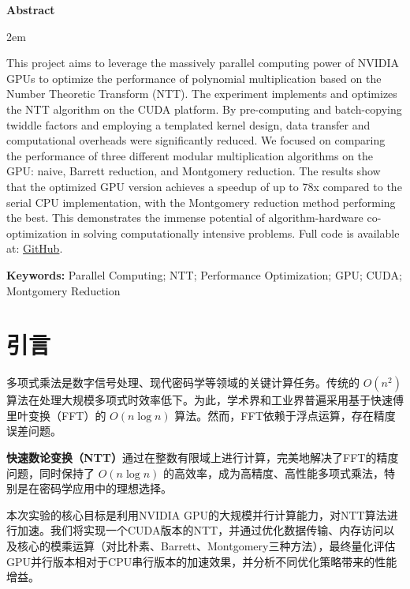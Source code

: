 \documentclass[a4paper]{article}
\newenvironment{enabstract}{
    \par\small
    \noindent\mbox{}\par\vspace{-\baselineskip}
    \par\parindent 2em
    }
    {\par\vspace{1em}}
\begin{document}
\begin{center}{\bfseries{Abstract}}\end{center}\par\vspace{0.5em}
\begin{enabstract}
This project aims to leverage the massively parallel computing power of NVIDIA GPUs to optimize the performance of polynomial multiplication based on the Number Theoretic Transform (NTT). The experiment implements and optimizes the NTT algorithm on the CUDA platform. By pre-computing and batch-copying twiddle factors and employing a templated kernel design, data transfer and computational overheads were significantly reduced. We focused on comparing the performance of three different modular multiplication algorithms on the GPU: naive, Barrett reduction, and Montgomery reduction. The results show that the optimized GPU version achieves a speedup of up to 78x compared to the serial CPU implementation, with the Montgomery reduction method performing the best. This demonstrates the immense potential of algorithm-hardware co-optimization in solving computationally intensive problems. Full code is available at: \href{https://github.com/aokimi0/parallel-programming}{GitHub}.

\vspace{1em}
\noindent\textbf{Keywords:} Parallel Computing; NTT; Performance Optimization; GPU; CUDA; Montgomery Reduction
\end{enabstract}

\clearpage
\tableofcontents
\newpage

\section{引言}
多项式乘法是数字信号处理、现代密码学等领域的关键计算任务。传统的 $O(n^2)$ 算法在处理大规模多项式时效率低下。为此，学术界和工业界普遍采用基于快速傅里叶变换（FFT）的 $O(n \log n)$ 算法。然而，FFT依赖于浮点运算，存在精度误差问题。

\textbf{快速数论变换（NTT）}通过在整数有限域上进行计算，完美地解决了FFT的精度问题，同时保持了 $O(n \log n)$ 的高效率，成为高精度、高性能多项式乘法，特别是在密码学应用中的理想选择。

本次实验的核心目标是利用NVIDIA GPU的大规模并行计算能力，对NTT算法进行加速。我们将实现一个CUDA版本的NTT，并通过优化数据传输、内存访问以及核心的模乘运算（对比朴素、Barrett、Montgomery三种方法），最终量化评估GPU并行版本相对于CPU串行版本的加速效果，并分析不同优化策略带来的性能增益。
\end{document}
